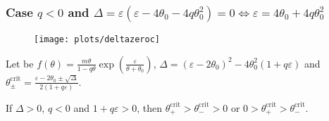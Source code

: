 \documentclass[
    8pt,
    aspectratio=1610,
    c,
    intlimits,
    leqno,
    professionalfonts,
]{beamer}
\begin{document}
\begin{frame}
	\frametitle{Case $q<0$ and
		\begin{math}
			\Delta=
			\varepsilon\left(\varepsilon-4\theta_{0}-4q\theta^{2}_{0}\right)=
			0\iff\varepsilon=4\theta_{0}+4q\theta^{2}_{0}
		\end{math}
	}

	\begin{figure}[ht!]
		\centering
		\texttt{[image: plots/deltazeroc]}
	\end{figure}
\end{frame}

\begin{frame}
	Let be
	\begin{math}
		f\left(\theta\right)=
		\frac{m\theta}{1-q\theta}
		\exp
		\left(
		\frac{\varepsilon}{\theta+\theta_{0}}
		\right)
	\end{math},
	\begin{math}
		\Delta=
		{\left(\varepsilon-2\theta_{0}\right)}^{2}-
		4\theta^{2}_{0}
		\left(1+q\varepsilon\right)
	\end{math}
	and
	\begin{math}
		\theta^{\text{crit}}_{\pm}=
		\frac{\varepsilon-2\theta_{0}\pm\sqrt{\Delta}}{2\left(1+q\varepsilon\right)}
	\end{math}.
	\begin{theorem}
		If
		\begin{math}
			\Delta>
			0
		\end{math},
		$q<0$ and $1+q\varepsilon>0$, then
		\begin{math}
			\theta^{\text{crit}}_{+}>
			\theta^{\text{crit}}_{-}>0
		\end{math}
		or
		\begin{math}
			0>
			\theta^{\text{crit}}_{+}>
			\theta^{\text{crit}}_{-}
		\end{math}.
	\end{theorem}


\end{frame}
\end{document}
